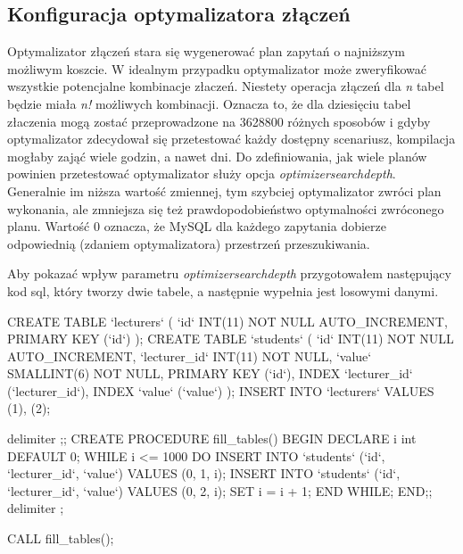 \subsection{Konfiguracja optymalizatora złączeń}
Optymalizator złączeń stara się wygenerować plan zapytań o najniższym możliwym koszcie. W idealnym przypadku optymalizator może zweryfikować wszystkie potencjalne kombinacje złaczeń. Niestety operacja złączeń dla \textit{n} tabel będzie miała \textit{n!} możliwych kombinacji. Oznacza to, że dla dziesięciu tabel złaczenia mogą zostać przeprowadzone na 3628800 różnych sposobów i gdyby optymalizator zdecydował się przetestować każdy dostępny scenariusz, kompilacja mogłaby zająć wiele godzin, a nawet dni. Do zdefiniowania, jak wiele planów powinien przetestować optymalizator służy opcja \textit{optimizer\textunderscore search\textunderscore depth}. Generalnie im niższa wartość zmiennej, tym szybciej optymalizator zwróci plan wykonania, ale zmniejsza się też prawdopodobieństwo optymalności zwróconego planu. Wartość 0 oznacza, że MySQL dla każdego zapytania dobierze odpowiednią (zdaniem optymalizatora) przestrzeń przeszukiwania.

Aby pokazać wpływ parametru \textit{optimizer\textunderscore search\textunderscore depth} przygotowałem następujący kod sql, który tworzy dwie tabele, a następnie wypełnia jest losowymi danymi.

\begin{spverbatim}
	CREATE TABLE `lecturers`
	(
	`id` INT(11) NOT NULL AUTO_INCREMENT,
	PRIMARY KEY (`id`)
	);
	CREATE TABLE `students`
	(
	`id` INT(11) NOT NULL AUTO_INCREMENT,
	`lecturer_id` INT(11) NOT NULL,
	`value` SMALLINT(6) NOT NULL,
	PRIMARY KEY (`id`),
	INDEX `lecturer_id` (`lecturer_id`),
	INDEX `value` (`value`)
	);
	INSERT INTO `lecturers` VALUES (1), (2);
	
	delimiter ;;
	CREATE PROCEDURE fill_tables()
	BEGIN
	DECLARE i int DEFAULT 0;
	WHILE i <= 1000 DO
	INSERT INTO `students` (`id`, `lecturer_id`, `value`) VALUES (0, 1, i);
	INSERT INTO `students` (`id`, `lecturer_id`, `value`) VALUES (0, 2, i);
	SET i = i + 1;
	END WHILE;
	END;;
	delimiter ;
	
	CALL fill_tables();
\end{spverbatim}

